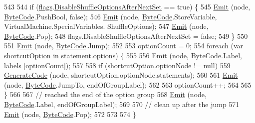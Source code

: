 \begin{DoxyCode}
543 
544             \textcolor{keywordflow}{if} (\hyperlink{a00034_a541022d89bcf9bc8f794eb6d6b438d08}{flags}.\hyperlink{a00034_a8b49bb7763ff477cba21d7c771ef3ed0}{DisableShuffleOptionsAfterNextSet} == \textcolor{keyword}{true}) \{
545                 \hyperlink{a00034_a774e8c143cdda0584fcfdda98626a83c}{Emit} (node, \hyperlink{a00031_ad5dfb6ee68ca7469623ad3e459f98894}{ByteCode}.PushBool, \textcolor{keyword}{false});
546                 \hyperlink{a00034_a774e8c143cdda0584fcfdda98626a83c}{Emit} (node, \hyperlink{a00031_ad5dfb6ee68ca7469623ad3e459f98894}{ByteCode}.StoreVariable, VirtualMachine.SpecialVariables.
      ShuffleOptions);
547                 \hyperlink{a00034_a774e8c143cdda0584fcfdda98626a83c}{Emit} (node, \hyperlink{a00031_ad5dfb6ee68ca7469623ad3e459f98894}{ByteCode}.Pop);
548                 flags.DisableShuffleOptionsAfterNextSet = \textcolor{keyword}{false};
549             \}
550 
551             \hyperlink{a00034_a774e8c143cdda0584fcfdda98626a83c}{Emit} (node, \hyperlink{a00031_ad5dfb6ee68ca7469623ad3e459f98894}{ByteCode}.Jump);
552 
553             optionCount = 0;
554             \textcolor{keywordflow}{foreach} (var shortcutOption \textcolor{keywordflow}{in} statement.options) \{
555 
556                 \hyperlink{a00034_a774e8c143cdda0584fcfdda98626a83c}{Emit} (node, \hyperlink{a00031_ad5dfb6ee68ca7469623ad3e459f98894}{ByteCode}.Label, labels [optionCount]);
557 
558                 \textcolor{keywordflow}{if} (shortcutOption.optionNode != null)
559                     \hyperlink{a00034_a006f3becd521cc179ba3d3352f6f930b}{GenerateCode} (node, shortcutOption.optionNode.statements);
560 
561                 \hyperlink{a00034_a774e8c143cdda0584fcfdda98626a83c}{Emit} (node, \hyperlink{a00031_ad5dfb6ee68ca7469623ad3e459f98894}{ByteCode}.JumpTo, endOfGroupLabel);
562 
563                 optionCount++;
564 
565             \}
566 
567             \textcolor{comment}{// reached the end of the option group}
568             \hyperlink{a00034_a774e8c143cdda0584fcfdda98626a83c}{Emit} (node, \hyperlink{a00031_ad5dfb6ee68ca7469623ad3e459f98894}{ByteCode}.Label, endOfGroupLabel);
569 
570             \textcolor{comment}{// clean up after the jump}
571             \hyperlink{a00034_a774e8c143cdda0584fcfdda98626a83c}{Emit} (node, \hyperlink{a00031_ad5dfb6ee68ca7469623ad3e459f98894}{ByteCode}.Pop);
572 
573 
574         \}
\end{DoxyCode}
